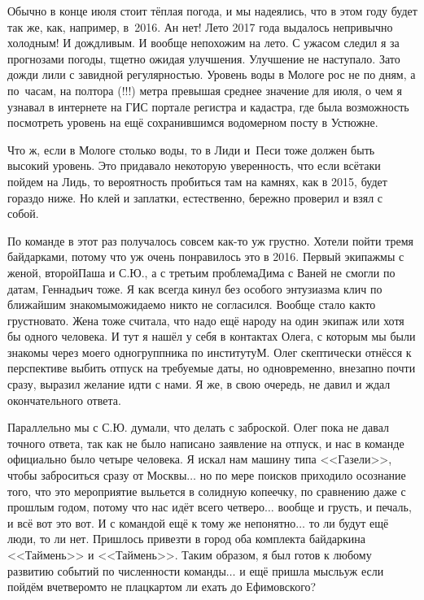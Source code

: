 Обычно в конце июля стоит тёплая погода, и мы надеялись, что в этом году будет так же, как, например, в~2016. Ан нет! Лето 2017 года выдалось непривычно холодным! И дождливым. И вообще непохожим на лето. С ужасом следил я за прогнозами погоды, тщетно ожидая улучшения. Улучшение не наступало. Зато дожди лили с завидной регулярностью. Уровень воды в Мологе рос не по дням, а по~часам, на полтора (!!!) метра превышая среднее значение для июля, о чем я узнавал в интернете на ГИС портале регистра и кадастра, где была возможность посмотреть уровень на ещё сохранившимся водомерном посту в Устюжне. 

Что ж, если в Мологе столько воды, то в Лиди и~Песи тоже должен быть высокий уровень. Это придавало некоторую уверенность, что если всё\sdash таки пойдем на Лидь, то вероятность пробиться там на камнях, как в 2015, будет гораздо ниже. Но клей и заплатки, естественно, бережно проверил и взял с собой.

По команде в этот раз получалось совсем как-то уж грустно. 
Хотели пойти тремя байдарками, потому что уж очень понравилось это в 2016. Первый экипаж\mdash мы с женой, второй\mdash Паша и С.Ю., а с третьим проблема\mdash Дима с Ваней не смогли по датам, Геннадьич тоже. Я как всегда кинул без особого энтузиазма клич по ближайшим знакомым\mdash ожидаемо никто не согласился. Вообще стало как\sdash то грустновато. Жена тоже считала, что надо ещё народу на один экипаж или хотя бы одного человека. И тут я нашёл у себя в контактах Олега, с которым мы были знакомы через моего одногруппника по институту\mdash М. Олег скептически отнёсся к перспективе выбить отпуск на требуемые даты, но одновременно, внезапно почти сразу, выразил желание идти с нами. Я же, в свою очередь, не давил и ждал окончательного ответа. 

Параллельно мы с С.Ю. думали, что делать с заброской. Олег пока не давал точного ответа, так как не было написано заявление на отпуск, и нас в команде официально было четыре человека. Я искал нам машину типа <<Газели>>, чтобы заброситься сразу от Москвы$\ldots$ но по мере поисков приходило осознание того, что это мероприятие выльется в солидную копеечку, по сравнению даже с прошлым годом, потому что нас идёт всего четверо$\ldots$ вообще и грусть, и печаль, и всё вот это вот. И с командой ещё к тому же непонятно$\ldots$ то ли будут ещё люди, то ли нет. Пришлось привезти в город оба комплекта байдарки\mdash на <<Таймень>> и <<Таймень>>. Таким образом, я был готов к любому развитию событий по численности команды$\ldots$ и ещё пришла мысль\mdash уж если пойдём вчетвером\mdash то не плацкартом ли ехать до Ефимовского?

